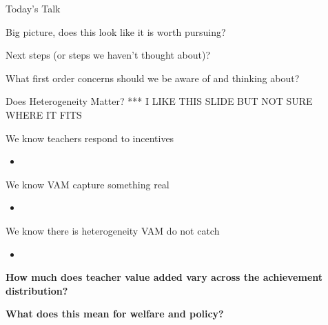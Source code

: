 \documentclass[t,aspectratio=169,11pt]{beamer}
\newenvironment{wideitemize}{\itemize\addtolength{\itemsep}{14pt}}{\enditemize}
\newenvironment{wideenumerate}{\enumerate\addtolength{\itemsep}{14pt}}{\endenumerate}
\begin{document}
\begin{frame}[c]{Today's Talk}

\begin{wideenumerate}
    \item Big picture, does this look like it is worth pursuing?
    \item Next steps (or steps we haven't thought about)?
    \item What first order concerns should we be aware of and thinking about?

\end{wideenumerate}
\end{frame}



\begin{frame}{Does Heterogeneity Matter? *** I LIKE THIS SLIDE BUT NOT SURE WHERE IT FITS}

\begin{wideitemize}
    \item We know teachers respond to incentives
    \begin{itemize}
        \item {}
    \end{itemize}
    \item We know VAM capture something real
    \begin{itemize}
        \item {}
    \end{itemize}
    \item We know there is heterogeneity VAM do not catch
    \begin{itemize}
        \item {}
    \end{itemize}
    
    \vfill
    \item \textbf{How much does teacher value added vary across the achievement distribution?} %
    \vspace{-14pt}
    \vspace{5mm}
    \item \textbf{What does this mean for welfare and policy?}
    \vfill
\end{wideitemize}
\end{frame}
\end{document}
